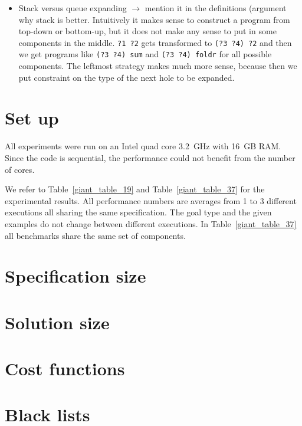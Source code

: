 \begin{itemize}
\begin{itemize}
\end{itemize}
\item Stack versus queue expanding $\rightarrow$ mention it in the definitions (argument why stack is better. Intuitively it makes sense to construct a program from top-down or bottom-up, but it does not make any sense to put in some components in the middle. \lstinline!?1 ?2! gets transformed to \lstinline!(?3 ?4) ?2! and then we get programs like \lstinline!(?3 ?4) sum! and \lstinline!(?3 ?4) foldr! for all possible components. The leftmost strategy makes much more sense, because then we put constraint on the type of the next hole to be expanded.
\end{itemize}

\section{Set up}
All experiments were run on an Intel quad core 3.2~GHz with 16~GB RAM. Since the code is sequential, the performance could not benefit from the number of cores.

We refer to Table~\ref{giant_table_19} and Table~\ref{giant_table_37} for the experimental results. All performance numbers are averages from 1 to 3 different executions all sharing the same specification. The goal type and the given examples do not change between different executions. In Table~\ref{giant_table_37} all benchmarks share the same set of components.

\section{Specification size}

\section{Solution size}
  
\section{Cost functions}

\section{Black lists}

